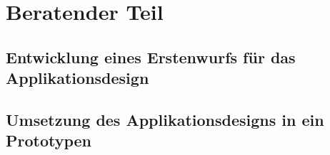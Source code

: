 \newpage
\section{Beratender Teil} \label{sec:beratender-teil}

\subsection{Entwicklung eines Erstenwurfs für das Applikationsdesign}\label{subsec:entwicklung-eines-erstenwurfs-fuer-das-applikationsdesign}

\subsection{Umsetzung des Applikationsdesigns in ein Prototypen}\label{subsec:umsetzung-des-applikationsdesigns-in-ein-prototypen}







